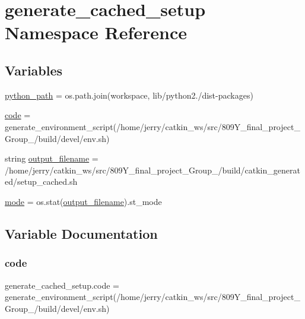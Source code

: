 \hypertarget{namespacegenerate__cached__setup}{}\section{generate\+\_\+cached\+\_\+setup Namespace Reference}
\label{namespacegenerate__cached__setup}
\subsection*{Variables}
\begin{DoxyCompactItemize}
\item 
\hyperlink{namespacegenerate__cached__setup_a72579fd01529a79bab20d99291889d3f}{python\+\_\+path} = os.\+path.\+join(workspace, \textquotesingle{}lib/python2./dist-\/packages\textquotesingle{})
\item 
\hyperlink{namespacegenerate__cached__setup_a52601295006f2366a311c4453d8f2f2e}{code} = generate\+\_\+environment\+\_\+script(\textquotesingle{}/home/jerry/catkin\+\_\+ws/src/809\+Y\+\_\+final\+\_\+project\+\_\+\+Group\+\_/build/devel/env.\+sh\textquotesingle{})
\item 
string \hyperlink{namespacegenerate__cached__setup_a0265aee5075ee1eb701ff69c98ad6793}{output\+\_\+filename} = \textquotesingle{}/home/jerry/catkin\+\_\+ws/src/809\+Y\+\_\+final\+\_\+project\+\_\+\+Group\+\_/build/catkin\+\_\+generated/setup\+\_\+cached.\+sh\textquotesingle{}
\item 
\hyperlink{namespacegenerate__cached__setup_a10081e5abedae9bd46dd91202096e789}{mode} = os.\+stat(\hyperlink{namespacegenerate__cached__setup_a0265aee5075ee1eb701ff69c98ad6793}{output\+\_\+filename}).st\+\_\+mode
\end{DoxyCompactItemize}


\subsection{Variable Documentation}
\mbox{\label{namespacegenerate__cached__setup_a52601295006f2366a311c4453d8f2f2e}} 
\subsubsection{\texorpdfstring{code}{code}}
{\footnotesize\ttfamily generate\+\_\+cached\+\_\+setup.\+code = generate\+\_\+environment\+\_\+script(\textquotesingle{}/home/jerry/catkin\+\_\+ws/src/809\+Y\+\_\+final\+\_\+project\+\_\+\+Group\+\_/build/devel/env.\+sh\textquotesingle{})}



